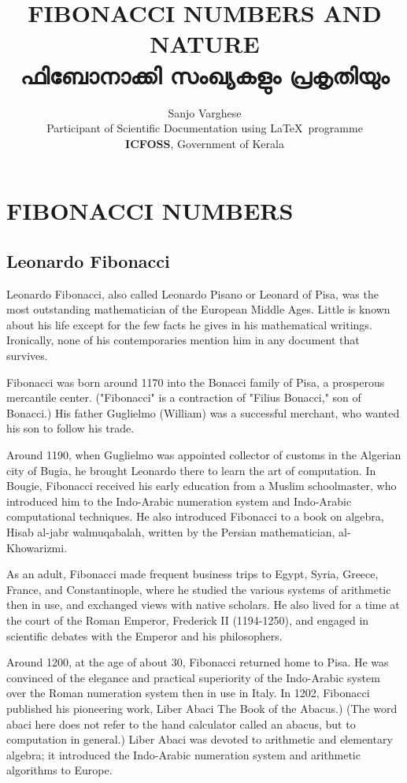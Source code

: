\documentclass[10pt]{report}
\title{\LARGE\textbf{FIBONACCI NUMBERS AND NATURE\\ ഫിബോനാക്കി സംഖ്യകളും പ്രകൃതിയും}}%
\author{Sanjo Varghese \\
 Participant of Scientific Documentation using \LaTeX\ programme \\
 \textbf{ICFOSS}, Government of Kerala
 }
\begin{document}
\maketitle
{}
\tableofcontents
\listoffigures
\listoftables

\chapter{FIBONACCI NUMBERS}
\section{Leonardo Fibonacci}

	\begin{multicols}{2}
Leonardo Fibonacci, also called Leonardo Pisano or Leonard of Pisa, was the most  outstanding mathematician of the European Middle Ages. Little is known about his life except for the few facts he gives in his mathematical writings. Ironically, none of his contemporaries mention him in any document that survives.

Fibonacci was born around 1170 into the Bonacci family of Pisa, a prosperous mercantile center. ("Fibonacci" is a contraction of "Filius Bonacci," son of Bonacci.) His father Guglielmo (William) was a successful merchant, who wanted his son to follow his trade.

Around 1190, when Guglielmo was appointed collector of customs in the Algerian city of Bugia, he brought Leonardo there to learn the art of computation. In Bougie, Fibonacci received his early education from a Muslim schoolmaster, who introduced him to the Indo-Arabic numeration system and Indo-Arabic computational techniques. He also introduced Fibonacci to a book on algebra, Hisab al-jabr walmuqabalah, written by the Persian mathematician, al-Khowarizmi.  

As an adult, Fibonacci made frequent business trips to Egypt, Syria, Greece, France, and Constantinople, where he studied the various systems of arithmetic then in use, and exchanged views with native scholars. He also lived for a time at the court of the Roman Emperor, Frederick II (1194-1250), and engaged in scientific debates with the Emperor and his philosophers.

Around 1200, at the age of about 30, Fibonacci returned home to Pisa. He was convinced of the elegance and practical superiority of the Indo-Arabic system over the Roman numeration system then in use in Italy. In 1202, Fibonacci published his pioneering work, Liber Abaci The Book of the Abacus.) (The word abaci here does not refer to the hand calculator called an abacus, but to computation in general.) Liber Abaci was devoted to arithmetic and elementary algebra; it introduced the Indo-Arabic numeration system and arithmetic algorithms to Europe. 

\end{multicols}
	
\end{document}
